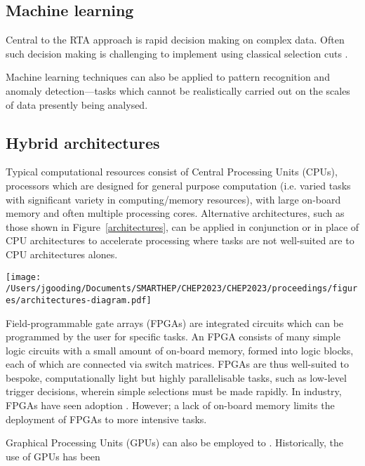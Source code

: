 \subsection{Machine learning}
\label{machine-learning}
Central to the RTA approach is rapid decision making on complex data. Often such decision making is challenging to implement using classical selection cuts  \cite{albertsson-ml}.\par
Machine learning techniques can also be applied to pattern recognition and anomaly detection—tasks which cannot be realistically carried out on the scales of data presently being analysed.

\subsection{Hybrid architectures}
\label{hybrid-architectures}
Typical computational resources consist of Central Processing Units (CPUs), processors which are designed for general purpose computation (i.e. varied tasks with significant variety in computing/memory resources), with large on-board memory and often multiple processing cores. Alternative architectures, such as those shown in Figure~\ref{architectures}, can be applied in conjunction or in place of CPU architectures to accelerate processing where tasks are not well-suited are to CPU architectures alones. \par

\begin{figure*}[h!]
    \centering
    \texttt{[image: /Users/jgooding/Documents/SMARTHEP/CHEP2023/CHEP2023/proceedings/figures/architectures-diagram.pdf]}
    \caption{Comparison of computing architectures.}
    \label{architectures}       %
\end{figure*}

Field-programmable gate arrays (FPGAs) are integrated circuits which can be programmed by the user for specific tasks. \cite{fpgas-intro} An FPGA consists of many simple logic circuits with a small amount of on-board memory, formed into logic blocks, each of which are connected via switch matrices. \cite{fpgas-book} FPGAs are thus well-suited to bespoke, computationally light but highly parallelisable tasks, such as low-level trigger decisions, wherein simple selections must be made rapidly. \cite{duarte-fpgas} In industry, FPGAs have seen adoption . However; a lack of on-board memory limits the deployment of FPGAs to more intensive tasks.\par
Graphical Processing Units (GPUs) can also be employed to . \cite{vomBruch-gpus} Historically, the use of GPUs has been 
